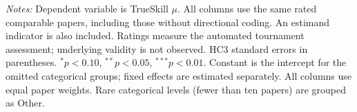 \begin{table}[htbp]
\par\vspace{4pt}\begin{minipage}{\textwidth}\footnotesize
\textit{Notes:} Dependent variable is TrueSkill $\mu$. All columns use the same rated comparable papers, including those without directional coding. An estimand indicator is also included. Ratings measure the automated tournament assessment; underlying validity is not observed. HC3 standard errors in parentheses. $^{*}p<0.10$, $^{**}p<0.05$, $^{***}p<0.01$. Constant is the intercept for the omitted categorical groups; fixed effects are estimated separately. All columns use equal paper weights. Rare categorical levels (fewer than ten papers) are grouped as Other.
\end{minipage}
\end{table}
